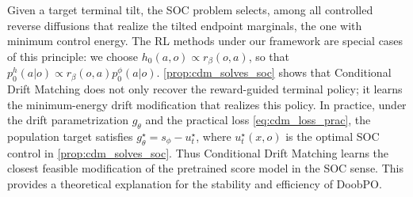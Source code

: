 \begin{remark}
\label{rem:ratio_h_interpretation}
Given a target terminal tilt, the SOC problem selects, among all controlled reverse diffusions that realize the tilted endpoint marginals, the one with minimum control energy.
The RL methods under our framework are special cases of this principle: we choose $h_0(a,o)\propto r_\beta(o,a)$, so that $p_0^h(a|o)\propto r_\beta(o,a)p_0^\phi(a|o)$.
\cref{prop:cdm_solves_soc} shows that Conditional Drift Matching does not only recover the reward-guided terminal policy; it learns the minimum-energy drift modification that realizes this policy.
In practice, under the drift parametrization $g_\theta$ and the practical loss \eqref{eq:cdm_loss_prac}, the population target satisfies $g_\theta^\star=s_\phi-u_t^\star$, where $u_t^\star(x,o)$ is the optimal SOC control in \cref{prop:cdm_solves_soc}.
Thus Conditional Drift Matching learns the closest feasible modification of the pretrained score model in the SOC sense.
This provides a theoretical explanation for the stability and efficiency of DoobPO.
\end{remark}